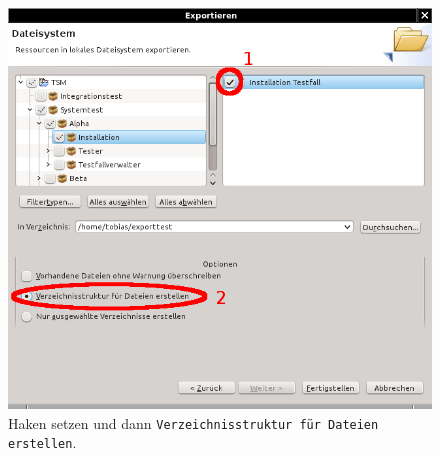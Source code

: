\documentclass[11pt,a4paper,titlepage]{article}
\begin{document}
\begin{figure}[H]
 \centering
 \includegraphics{./assistent-exp2.png}
 \caption{Haken setzen und dann \texttt{Verzeichnisstruktur für Dateien erstellen}.}
 \label{abb:Assistent-exp2}
\end{figure}
\end{document}
